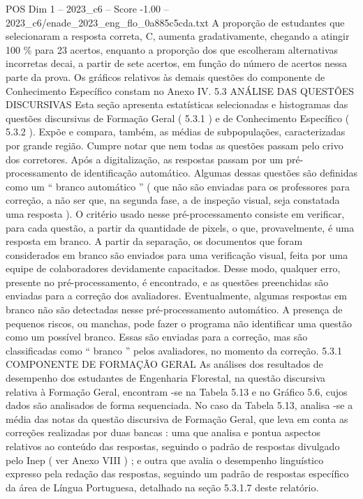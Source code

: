 \begin{textsample}{POS Dim 1 – 2023\_c6 – Score -1.00 – 2023\_c6/enade\_2023\_eng\_flo\_0a885c5cda.txt}
A proporção de estudantes que selecionaram a resposta correta, C, aumenta gradativamente, chegando a atingir 100 \% para 23 acertos, enquanto a proporção dos que escolheram alternativas incorretas decai, a partir de sete acertos, em função do número de acertos nessa parte da prova.
Os gráficos relativos às demais questões do componente de Conhecimento Específico constam no Anexo IV. 5.3 ANÁLISE DAS QUESTÕES DISCURSIVAS Esta seção apresenta estatísticas selecionadas e histogramas das questões discursivas de Formação Geral ( 5.3.1 ) e de Conhecimento Específico ( 5.3.2 ).
Expõe e compara, também, as médias de subpopulações, caracterizadas por grande região.
Cumpre notar que nem todas as questões passam pelo crivo dos corretores.
Após a digitalização, as respostas passam por um pré-processamento de identificação automático.
Algumas dessas questões são definidas como um “ branco automático ” ( que não são enviadas para os professores para correção, a não ser que, na segunda fase, a de inspeção visual, seja constatada uma resposta ).
O critério usado nesse pré-processamento consiste em verificar, para cada questão, a partir da quantidade de pixels, o que, provavelmente, é uma resposta em branco.
A partir da separação, os documentos que foram considerados em branco são enviados para uma verificação visual, feita por uma equipe de colaboradores devidamente capacitados.
Desse modo, qualquer erro, presente no pré-processamento, é encontrado, e as questões preenchidas são enviadas para a correção dos avaliadores.
Eventualmente, algumas respostas em branco não são detectadas nesse pré-processamento automático.
A presença de pequenos riscos, ou manchas, pode fazer o programa não identificar uma questão como um possível branco.
Essas são enviadas para a correção, mas são classificadas como “ branco ” pelos avaliadores, no momento da correção. 5.3.1 COMPONENTE DE FORMAÇÃO GERAL As análises dos resultados de desempenho dos estudantes de Engenharia Florestal, na questão discursiva relativa à Formação Geral, encontram -se na Tabela 5.13 e no Gráfico 5.6, cujos dados são analisados de forma sequenciada.
No caso da Tabela 5.13, analisa -se a média das notas da questão discursiva de Formação Geral, que leva em conta as correções realizadas por duas bancas : uma que analisa e pontua aspectos relativos ao conteúdo das respostas, seguindo o padrão de respostas divulgado pelo Inep ( ver Anexo VIII ) ; e outra que avalia o desempenho linguístico expresso pela redação das respostas, seguindo um padrão de respostas específico da área de Língua Portuguesa, detalhado na seção 5.3.1.7 deste relatório.

\end{textsample}
